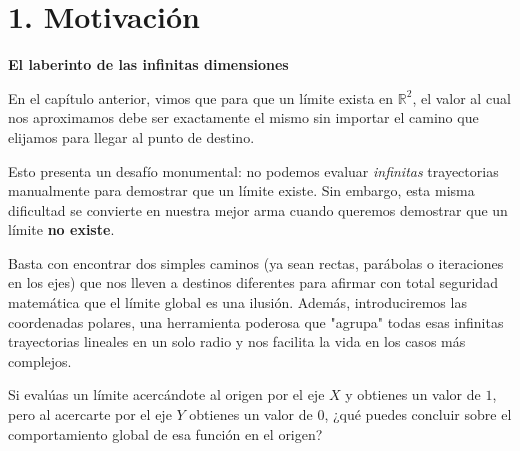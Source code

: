 \documentclass[11pt]{article}
\newenvironment{motivacion}{%
  \section*{1. Motivación}%
}{}
\newenvironment{preguntaguia}{%
  \begin{tcolorbox}[colback=cyan!5,colframe=cyan!75!black,title=Pregunta Guía]%
}{%
  \end{tcolorbox}%
}
\begin{document}
\begin{motivacion}
  \textbf{El laberinto de las infinitas dimensiones}

  En el capítulo anterior, vimos que para que un límite exista en $\mathbb{R}^2$, el valor al cual nos aproximamos debe ser exactamente el mismo sin importar el camino que elijamos para llegar al punto de destino. 
  
  Esto presenta un desafío monumental: no podemos evaluar \textit{infinitas} trayectorias manualmente para demostrar que un límite existe. Sin embargo, esta misma dificultad se convierte en nuestra mejor arma cuando queremos demostrar que un límite \textbf{no existe}. 

  Basta con encontrar dos simples caminos (ya sean rectas, parábolas o iteraciones en los ejes) que nos lleven a destinos diferentes para afirmar con total seguridad matemática que el límite global es una ilusión. Además, introduciremos las coordenadas polares, una herramienta poderosa que "agrupa" todas esas infinitas trayectorias lineales en un solo radio y nos facilita la vida en los casos más complejos.

  \begin{preguntaguia}
    Si evalúas un límite acercándote al origen por el eje $X$ y obtienes un valor de $1$, pero al acercarte por el eje $Y$ obtienes un valor de $0$, ¿qué puedes concluir sobre el comportamiento global de esa función en el origen?
  \end{preguntaguia}
\end{motivacion}
\end{document}
